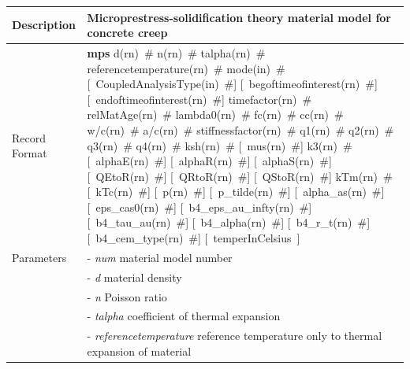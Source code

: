 \documentclass[a4paper]{article}
\newcommand{\descitem}[1]{{\noindent \bf #1}}
\newcommand{\elemparam}[2]{{{#1\tiny (#2)}~\#}}
\newcommand{\optelemparam}[2]{[{~\elemparam{#1}{#2}}]}
\newcommand{\elemstring}[1]{{#1}}
\newcommand{\optelemstring}[1]{[{~\elemstring{#1}~}]}
\newcommand{\param}[1]{{\it #1}}
\newenvironment{mmt}{\begin{tabular}{|l|p{9cm}|}}{\end{tabular}\\}
\newenvironment{mmt}{\begin{tabular}{|l|l|}}{\end{tabular}\\}
\begin{document}
\begin{table}[!htb]
\begin{mmt}
\hline
Description & Microprestress-solidification theory material model for concrete creep\\
\hline
Record Format & \descitem{mps} 
\elemparam{d}{rn} \elemparam{n}{rn} \elemparam{talpha}{rn} \elemparam{referencetemperature}{rn}
%
\elemparam{mode}{in} 
\optelemparam{CoupledAnalysisType}{in}
\optelemparam{begoftimeofinterest}{rn} \optelemparam{endoftimeofinterest}{rn} \elemparam{timefactor}{rn} \elemparam{relMatAge}{rn} \elemparam{lambda0}{rn}
\elemparam{fc}{rn} \elemparam{cc}{rn} \elemparam{w/c}{rn} \elemparam{a/c}{rn} \elemparam{stiffnessfactor}{rn} 
\elemparam{q1}{rn} \elemparam{q2}{rn} \elemparam{q3}{rn} \elemparam{q4}{rn}
%
%
\elemparam{ksh}{rn} 
\optelemparam{mus}{rn} \elemparam{k3}{rn} 
%
\optelemparam{alphaE}{rn} \optelemparam{alphaR}{rn} \optelemparam{alphaS}{rn}
\optelemparam{QEtoR}{rn} \optelemparam{QRtoR}{rn} \optelemparam{QStoR}{rn}
%
\elemparam{kTm}{rn}  \optelemparam{kTc}{rn} 
%
\optelemparam{p}{rn} \optelemparam{p\_tilde}{rn}  
%
\optelemparam{alpha\_as}{rn} \optelemparam{eps\_cas0}{rn}
\optelemparam{b4\_eps\_au\_infty}{rn} \optelemparam{b4\_tau\_au}{rn} \optelemparam{b4\_alpha}{rn} \optelemparam{b4\_r\_t}{rn} \optelemparam{b4\_cem\_type}{rn} 
%
\optelemstring{temperInCelsius}
%             
\\Parameters 
&- \param{num} material model number\\
&- \param{d} material density\\
&- \param{n} Poisson ratio\\
&- \param{talpha} coefficient of thermal expansion\\
&- \param{referencetemperature} reference temperature only to thermal expansion of material\\


\end{mmt}
\end{table}
\end{document}
